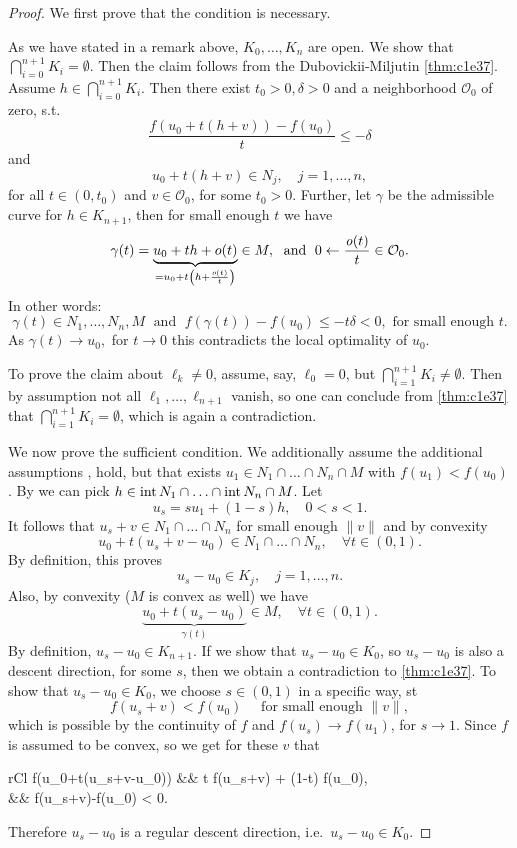 \documentclass[../skript.tex]{subfiles}
\begin{document}
\begin{proof}
	We first prove that the condition is necessary.\par
	As we have stated in a remark above, $K_0,\ldots,K_n$ are open. We show that $\bigcap_{i=0}^{n+1}K_i=\emptyset$. Then the claim follows from the Dubovickii-Miljutin \cref{thm:c1e37}. Assume $h\in\bigcap_{i=0}^{n+1}K_i$. Then there exist $t_0>0,\delta>0$ and a neighborhood $\mathcal{O}_0$ of zero, s.t.
	\[
		\frac{f(u_0+  t(h+v)) - f(u_0)}{t}\leq -\delta 
	\]
	and
	\[
		u_0 + t(h+v)\in N_j,\quad j=1,\ldots,n,
	\]
	for all $t\in(0,t_0)$ and $v\in\mathcal{O}_0$, for some $t_0 > 0$. Further, let $\gamma$ be the admissible curve for $h\in K_{n+1}$, then for small enough $t$ we have
	\[
		\gamma(t) = \underbrace{u_0 + th + o(t)}_{=u_0 + t\left(h+\frac{\mathit{o}(t)}{t}\right)}\in M, \; \text{ and } \; 0\leftarrow\frac{\mathit{o}(t)}{t}\in\mathcal{O}_0.
	\]
	In other words:
	\[
		\gamma(t)\in N_1,\ldots,N_n,M\;\text{ and }\;f(\gamma(t)) - f(u_0) \leq -t\delta < 0,\text{ for small enough }t.
	\]
	As $\gamma(t)\to u_0,$ for $t\to 0$ this contradicts the local optimality of $u_0$.\par
	To prove the claim about $\ell_k\not=0$, assume, say, $\ell_0 = 0$, but $\bigcap_{i=1}^{n+1}K_i\not=\emptyset$. Then by assumption not all $\ell_1,\ldots,\ell_{n+1}$ vanish, so one can conclude from \cref{thm:c1e37} that $\bigcap_{i=1}^{n+1}K_i = \emptyset$, which is again a contradiction.\par
	We now prove the sufficient condition. We additionally assume the additional assumptions ,  hold, but that exists $u_1\in N_1\cap\ldots\cap N_n\cap M$ with $f(u_1)<f(u_0)$. By  we can pick $h\in \operatorname{int} N_1 \cap\ldots\cap \operatorname{int} N_n\cap M$. Let
	\[
		u_s = su_1 + (1-s)h,\quad 0<s<1.
	\]
	It follows that $u_s+v\in N_1\cap\ldots\cap N_n$ for small enough $\|v\|$ and by convexity
	\[
		u_0 + t(u_s+v-u_0)\in N_1\cap\ldots\cap N_n,\quad\forall t\in (0,1).
	\]
	By definition, this proves
	\[
		u_s-u_0\in K_j,\quad j=1,\ldots,n.
	\]
	Also, by convexity ($M$ is convex as well) we have 
	\[
		\underbrace{u_0 + t(u_s-u_0)}_{\gamma(t)}\in M,\quad\forall t\in(0,1).
	\]
	By definition, $u_s-u_0 \in K_{n+1}$. If we show that $u_s-u_0\in K_0$, so $u_s-u_0$ is also a descent direction, for some $s$, then we obtain a contradiction to \cref{thm:c1e37}. To show that $u_s-u_0\in K_0$, we choose $s\in(0,1)$ in a specific way, \ac{st}
	\[
		f(u_s+v) < f(u_0)\quad\text{ for small enough }\|v\|,
	\]
	which is possible by the continuity of $f$ and $f(u_s)\to f(u_1)$, for $s\to 1$. Since $f$ is assumed to be convex, so we get for these $v$ that
	\begin{IEEEeqnarray*}{rCl}
		f(u_0+t(u_s+v-u_0)) &\leq& t f(u_s+v) + (1-t) f(u_0), \\
			&\leq& f(u_s+v)-f(u_0) < 0.
	\end{IEEEeqnarray*}
	Therefore $u_s-u_0$ is a regular descent direction, i.e.\ $u_s-u_0\in K_0$.
\end{proof}
\end{document}
